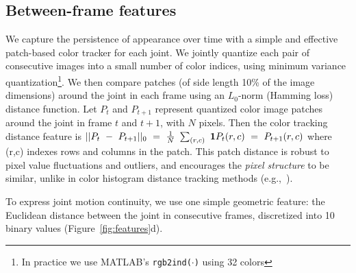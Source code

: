 \subsection{Between-frame features}
  We capture the persistence of 
appearance over time with a simple and effective patch-based color tracker for 
each joint.  We jointly quantize each pair of consecutive images into a small 
number of color indices, using minimum variance quantization\footnote{In 
practice we use MATLAB's \texttt{rgb2ind($\cdot$)} using 32 colors}.  We then 
compare patches (of side length 10\% of the image dimensions) around the joint 
in each frame using an $L_0$-norm (Hamming loss) distance function.  Let 
$P_{t}$ and $P_{t+1}$ represent quantized color image patches around the joint 
in frame $t$ and $t+1$, with $N$ pixels.  Then the color tracking distance 
feature is $ ||P_t~-~P_{t+1}||_0~=~\frac{1}{N}~\sum_{(r,c)}~\mathbf{1}{P_{t}(r,c)~=~P_{t+1}(r,c)}$ 
where (r,c) indexes rows and columns in the patch.  This patch distance is robust to pixel value fluctuations and outliers, and encourages the {\em pixel structure} to be similar, unlike in color histogram distance tracking methods (e.g.,~\cite{ren07}).



 To express joint motion continuity, we use one simple 
geometric feature: the Euclidean distance between the joint in consecutive 
frames, discretized into 10 binary values (Figure~\ref{fig:features}d).


